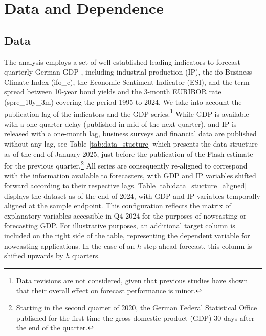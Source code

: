 \documentclass[11pt,a4paper]{article}
\begin{document}
\section{Data and Dependence}\label{sec:data}
\subsection{Data}
The analysis employs a set of well-established leading indicators to forecast quarterly German GDP \citep{Drechsel2012financial,Heinisch2018bottom}, including industrial production (IP), the ifo Business Climate Index (ifo\_c), the Economic Sentiment Indicator (ESI), and the term spread between 10-year bond yields and the 3-month EURIBOR rate (spre\_10y\_3m) covering the period 1995 to 2024.  
We take into account the publication lag of the indicators and the GDP series.\footnote{Data revisions are not considered, given that previous studies \citep{Heinisch2019} have shown that their overall effect on forecast performance is minor.} 
While GDP is available with a one-quarter delay (published in mid of the next quarter), and IP is released with a one-month lag, business surveys and financial data are published without any lag, see Table \ref{tab:data_stucture} which presents the data structure as of the end of January 2025, just before the publication of the Flash estimate for the previous quarter.\footnote{Starting in the second quarter of 2020, the German Federal Statistical Office published for the first time the gross domestic product (GDP) 30 days after the end of the quarter.} All series are consequently re-aligned to correspond with the information available to forecasters, with GDP and IP variables shifted forward according to their respective lags. Table \ref{tab:data_stucture_aligned} displays the dataset as of the end of 2024, with GDP and IP variables temporally aligned at the sample endpoint. This configuration reflects the matrix of explanatory variables accessible in Q4-2024 for the purposes of nowcasting or forecasting GDP. For illustrative purposes, an additional target column is included on the right side of the table, representing the dependent variable for nowcasting applications. In the case of an $h$-step ahead forecast, this column is shifted upwards by $h$ quarters. 
\end{document}
